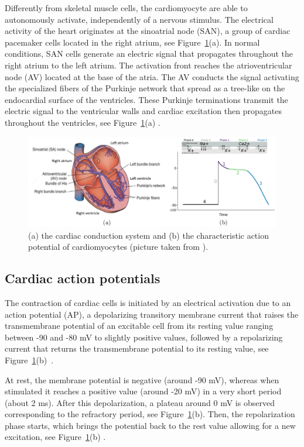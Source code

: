 \documentclass[11pt,a4paper]{article}
\begin{document}
Differently from skeletal muscle cells, the cardiomyocyte are able to autonomously activate, independently of a nervous stimulus. The electrical activity of the heart originates at the sinoatrial node (SAN), a group of cardiac pacemaker cells located in the right atrium, see Figure~\ref{fig:heart}(a). In normal conditions, SAN cells generate an electric signal that propagates throughout the right atrium to the left atrium. The activation front reaches the atrioventricular node (AV) located at the base of the atria. The AV conducts the signal activating the specialized fibers of the Purkinje network that spread as a tree-like on the endocardial surface of the ventricles. These Purkinje terminations transmit the electric signal to the ventricular walls and cardiac excitation then propagates throughout the ventricles, see Figure~\ref{fig:heart}(a) \cite{franzone2014mathematical}. 
\begin{figure}
	\centering
	\includegraphics[width=1\textwidth]{./Images/heart_activation.png}
	\caption{(a) the cardiac conduction system and (b) the characteristic action potential of cardiomyocytes (picture taken from \cite{quarteroni2019}).}
	\label{fig:heart}
\end{figure}

\subsection{Cardiac action potentials}\label{subsec:ap}

The contraction of cardiac cells is initiated by an electrical activation due to an action potential (AP), a depolarizing transitory membrane current
that raises the transmembrane potential of an excitable cell from its resting value ranging between -90 and -80 mV to slightly positive values, followed by a repolarizing current that returns the transmembrane potential to its resting value, see Figure~\ref{fig:heart}(b)~\cite{franzone2014mathematical}. 

At rest, the membrane potential is negative (around -90 mV), whereas when stimulated it reaches a positive value (around -20 mV) in a very short period (about 2 ms). After this depolarization, a plateau around 0 mV is observed corresponding to the refractory period, see Figure~\ref{fig:heart}(b).
Then, the repolarization phase starts, which brings the potential back to
the rest value allowing for a new excitation, see Figure~\ref{fig:heart}(b) \cite{quarteroni2019}. 
\end{document}
